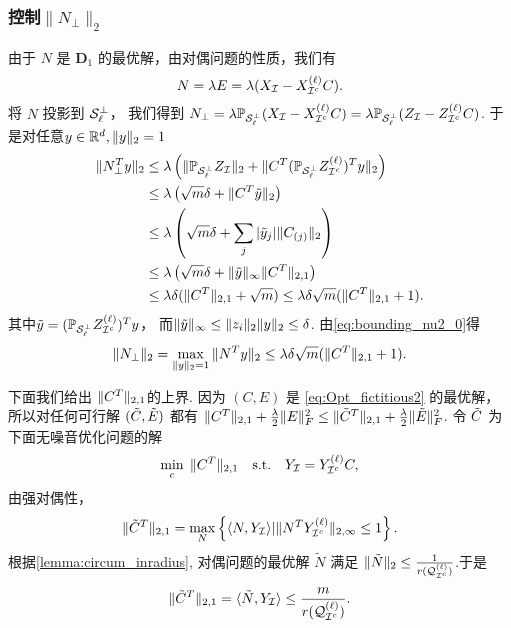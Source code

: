 \subsubsection{控制\(\|N_{\perp}\|_2\)}
由于 \(N\) 是 \(\mathbf{D}_1\) 的最优解，由对偶问题的性质，我们有
\[ N=\lambda E=\lambda(X_{\mathcal{I}}-X^{(\ell)}_{\mathcal{I}^c}C). \]
将 \(N\) 投影到 \(\mathcal{S}^{\perp}_{\ell}\)， 我们得到
\(N_{\perp}=\lambda \mathbb{P}_{\mathcal{S}_{\ell}^{\perp}}(X_{\mathcal{I}}-X^{(\ell)}_{\mathcal{I}^c}C)
= \lambda \mathbb{P}_{\mathcal{S}_{\ell}^{\perp}}(Z_{\mathcal{I}}-Z^{(\ell)}_{\mathcal{I}^c}C)\).
于是对任意\(y\in \mathbb{R}^d, \|y\|_2=1\)
\begin{align}
  \|N_{\perp}^T y\|_2 & \leq\lambda \left(\|\mathbb{P}_{\mathcal{S}_{\ell}^{\perp}}Z_{\mathcal{I}}\|_2
  +\|C^T (\mathbb{P}_{\mathcal{S}_{\ell}^{\perp}}Z^{(\ell)}_{\mathcal{I}^c})^T y\|_2\right)\nonumber\\
  & \leq \lambda\left( \sqrt{m} \delta + \|C^T \tilde{y}\|_2\right) \nonumber\\
  & \leq \lambda\left( \sqrt{m} \delta + \sum_j |\tilde{y}_j|\|C_{(j)}\|_2\right) \nonumber\\
  & \leq \lambda\left( \sqrt{m} \delta + \|\tilde{y}\|_{\infty}\|C^T\|_{2,1}\right) \nonumber\\
  & \leq \lambda \delta(\|C^T\|_{2,1}+\sqrt{m}) \leq \lambda\delta\sqrt{m}(\|C^T\|_{2,1}+1).
  \label{eq:bounding_nu2_0}
\end{align}
其中\(\tilde{y}=(\mathbb{P}_{\mathcal{S}_{\ell}^{\perp}}Z^{(\ell)}_{\mathcal{I}^c})^Ty\)，
而\(\|\tilde{y}\|_\infty \leq \|z_i\|_2 \|y\|_2 \leq
\delta\). 由\eqref{eq:bounding_nu2_0}得
\begin{align}
  \|N_{\perp}\|_2 = \max_{\|y\|_2=1} \|N^T y\|_2 \le \lambda\delta\sqrt{m}(\|C^T\|_{2,1}+1).
  \label{eq:bounding_nu2}
\end{align}

下面我们给出 \(\|C^T\|_{2,1}\)的上界.
因为 \((C,E)\) 是 \eqref{eq:Opt_fictitious2} 的最优解，所以对任何可行解 \((\tilde{C} ,\tilde{E})\)
都有 \(\|C^T\|_{2,1}+\frac{\lambda}{2}\|E\|^2_F \leq \|\tilde{C}^T\|_{2,1}+\frac{\lambda}{2}\|\tilde{E}\|_F^2\).
令 \(\tilde{C}\) 为下面无噪音优化问题的解
\begin{align}\label{eq:Opt_y only}
\min_{c} \; \|C^T\|_{2,1} \quad
\text{s.t.} \quad Y_{\mathcal{I}}=Y^{(\ell)}_{\mathcal{I}^c}C,
\end{align}
由强对偶性，
\[\|\tilde{C}^T\|_{2,1} = \max_{N}\left\{\langle N,Y_{\mathcal{I}}\rangle | \|N^T
Y^{(\ell)}_{\mathcal{I}^c}\|_{2, \infty}\leq 1\right\}.\]
根据\autoref{lemma:circum_inradius}, 对偶问题的最优解 \(\tilde{N}\) 满足
\(\|\tilde{N}\|_2 \leq \frac{1}{r(\mathcal{Q}_{\mathcal{I}^c}^{(\ell)})}\).于是
\[\|\tilde{C}^T\|_{2,1} = \langle\tilde{N},Y_{\mathcal{I}}\rangle \leq
\frac{m}{r(\mathcal{Q}_{\mathcal{I}^c}^{(\ell)})}.\]

